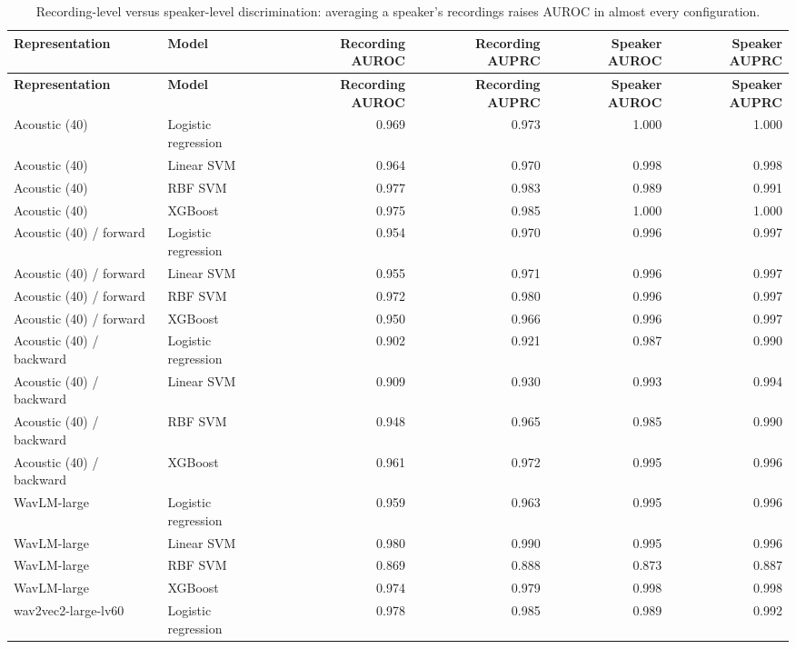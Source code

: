 \documentclass[10pt,a4paper]{article}
\begin{document}
\begin{center}\tiny\renewcommand{\arraystretch}{1.12}
\begin{longtable}{p{3.6cm}p{2.4cm}rrrr}
\caption{Recording-level versus speaker-level discrimination: averaging a speaker's recordings raises AUROC in almost every configuration.}\\
\toprule
\textbf{Representation} & \textbf{Model} & \textbf{Recording AUROC} & \textbf{Recording AUPRC} & \textbf{Speaker AUROC} & \textbf{Speaker AUPRC}\\\midrule\endfirsthead
\toprule
\textbf{Representation} & \textbf{Model} & \textbf{Recording AUROC} & \textbf{Recording AUPRC} & \textbf{Speaker AUROC} & \textbf{Speaker AUPRC}\\\midrule\endhead
\bottomrule\endfoot
Acoustic (40) & Logistic regression & 0.969 & 0.973 & 1.000 & 1.000\\
Acoustic (40) & Linear SVM & 0.964 & 0.970 & 0.998 & 0.998\\
Acoustic (40) & RBF SVM & 0.977 & 0.983 & 0.989 & 0.991\\
Acoustic (40) & XGBoost & 0.975 & 0.985 & 1.000 & 1.000\\
Acoustic (40) / forward & Logistic regression & 0.954 & 0.970 & 0.996 & 0.997\\
Acoustic (40) / forward & Linear SVM & 0.955 & 0.971 & 0.996 & 0.997\\
Acoustic (40) / forward & RBF SVM & 0.972 & 0.980 & 0.996 & 0.997\\
Acoustic (40) / forward & XGBoost & 0.950 & 0.966 & 0.996 & 0.997\\
Acoustic (40) / backward & Logistic regression & 0.902 & 0.921 & 0.987 & 0.990\\
Acoustic (40) / backward & Linear SVM & 0.909 & 0.930 & 0.993 & 0.994\\
Acoustic (40) / backward & RBF SVM & 0.948 & 0.965 & 0.985 & 0.990\\
Acoustic (40) / backward & XGBoost & 0.961 & 0.972 & 0.995 & 0.996\\
WavLM-large & Logistic regression & 0.959 & 0.963 & 0.995 & 0.996\\
WavLM-large & Linear SVM & 0.980 & 0.990 & 0.995 & 0.996\\
WavLM-large & RBF SVM & 0.869 & 0.888 & 0.873 & 0.887\\
WavLM-large & XGBoost & 0.974 & 0.979 & 0.998 & 0.998\\
wav2vec2-large-lv60 & Logistic regression & 0.978 & 0.985 & 0.989 & 0.992\\

\end{longtable}
\end{center}
\end{document}
